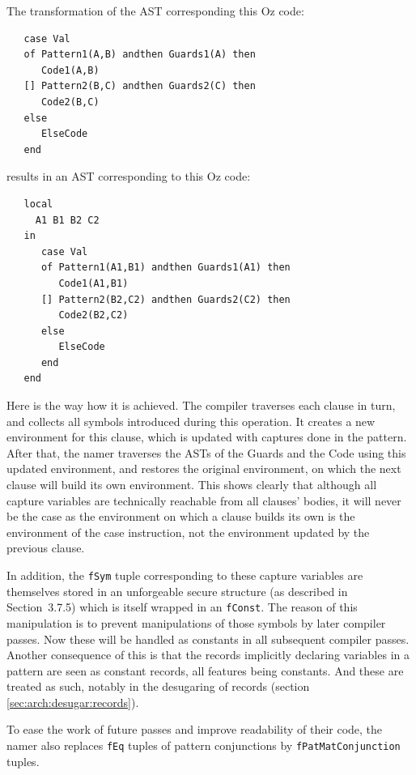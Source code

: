 \documentclass[a4paper]{memoir}
\begin{document}
The transformation of the AST corresponding this Oz code:
\begin{lstlisting}
   case Val
   of Pattern1(A,B) andthen Guards1(A) then
      Code1(A,B)
   [] Pattern2(B,C) andthen Guards2(C) then
      Code2(B,C)
   else
      ElseCode
   end
\end{lstlisting}
results in an AST corresponding to this Oz code:
\begin{lstlisting}
   local
     A1 B1 B2 C2
   in
      case Val
      of Pattern1(A1,B1) andthen Guards1(A1) then
         Code1(A1,B1)
      [] Pattern2(B2,C2) andthen Guards2(C2) then
         Code2(B2,C2)
      else
         ElseCode
      end
   end
\end{lstlisting}

Here is the way how it is achieved. The compiler traverses each clause in turn,
and collects all symbols introduced during this operation. It creates a new
environment for this clause, which is updated with captures done in the
pattern. After that, the namer traverses the ASTs of the Guards and the Code
using this updated environment, and restores the original environment, on which
the next clause will build its own environment. This shows clearly that
although all capture variables are technically reachable from all clauses'
bodies, it will never be the case as the environment on which a clause builds
its own is the environment of the case instruction, not the environment updated
by the previous clause. 

In addition, the \lstinline!fSym! tuple corresponding to these capture
variables are themselves stored in an unforgeable secure structure (as
described in \cite{VRH04} Section~3.7.5) which is itself wrapped in an
\lstinline!fConst!. The reason of this manipulation is to prevent manipulations
of those symbols by later compiler passes. Now these will be handled as
constants in all subsequent compiler passes. Another consequence of this is
that the records implicitly declaring variables in a pattern are seen as
constant records, all features being constants. And these are treated as such,
notably in the desugaring of records (section \ref{sec:arch:desugar:records}).

To ease the work of future passes and improve readability of their code, the
namer also replaces \lstinline!fEq! tuples of pattern conjunctions by
\lstinline!fPatMatConjunction! tuples.
\end{document}
